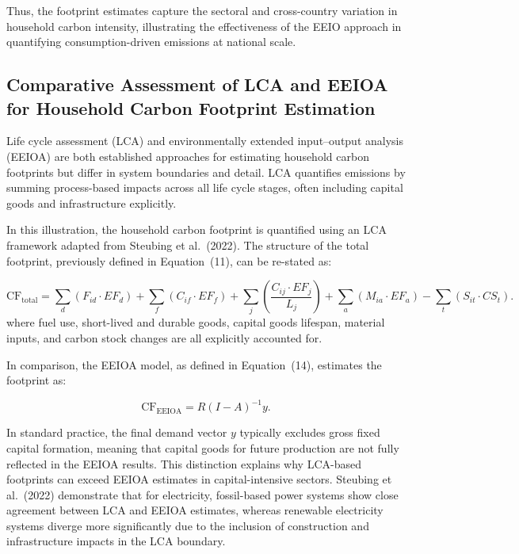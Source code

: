 \documentclass[12pt,a4paper]{article}%
\begin{document}
Thus, the footprint estimates capture the sectoral and cross-country variation in household carbon intensity, illustrating the effectiveness of the EEIO approach in quantifying consumption-driven emissions at national scale.


\subsection{Comparative Assessment of LCA and EEIOA for Household Carbon Footprint Estimation}

Life cycle assessment (LCA) and environmentally extended input--output analysis (EEIOA) are both established approaches for estimating household carbon footprints but differ in system boundaries and detail. LCA quantifies emissions by summing process-based impacts across all life cycle stages, often including capital goods and infrastructure explicitly.

In this illustration, the household carbon footprint is quantified using an LCA framework adapted from Steubing et al.~(2022). The structure of the total footprint, previously defined in Equation~(11), can be re-stated as:

\begin{equation}
\text{CF}_{\text{total}} = \sum_d (F_{id} \cdot EF_d) 
+ \sum_f (C_{if} \cdot EF_f) 
+ \sum_j \left( \frac{C_{ij} \cdot EF_j}{L_j} \right)
+ \sum_a (M_{ia} \cdot EF_a)
- \sum_t (S_{it} \cdot CS_t).
\end{equation}
where fuel use, short-lived and durable goods, capital goods lifespan, material inputs, and carbon stock changes are all explicitly accounted for.

In comparison, the EEIOA model, as defined in Equation~(14), estimates the footprint as:

\begin{equation}
\text{CF}_{\text{EEIOA}} = {R (I - A)}^{-1} y.
\end{equation}

In standard practice, the final demand vector $y$ typically excludes gross fixed capital formation, meaning that capital goods for future production are not fully reflected in the EEIOA results. This distinction explains why LCA-based footprints can exceed EEIOA estimates in capital-intensive sectors. Steubing et al.~(2022) demonstrate that for electricity, fossil-based power systems show close agreement between LCA and EEIOA estimates, whereas renewable electricity systems diverge more significantly due to the inclusion of construction and infrastructure impacts in the LCA boundary.
\end{document}

